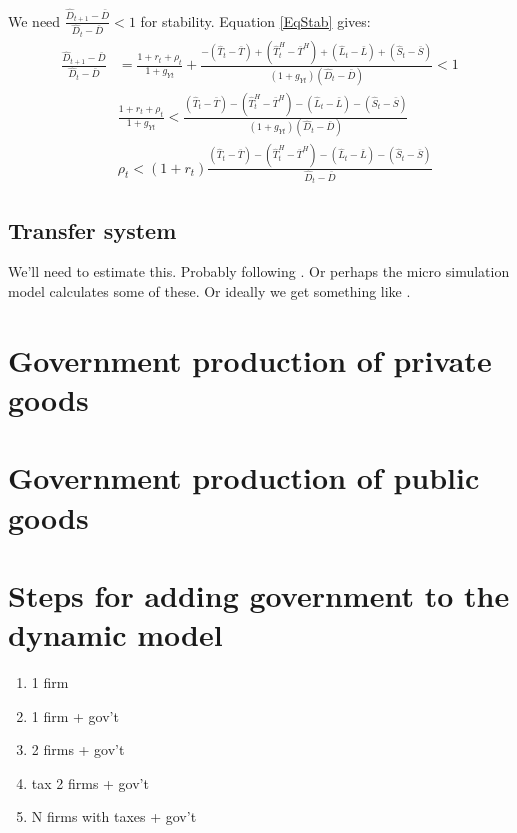       We need $\frac{\hat D_{t+1} - \bar D}{\hat D_{t} - \bar D} < 1$ for stability.  Equation \eqref{EqStab} gives:
      \begin{align} 
        \frac{\hat D_{t+1} - \bar D}{\hat D_t -\bar D} & = \frac{1+r_t+\rho_t}{1+g_{Yt}}  + \frac{-(\hat T_t - \bar T) + (\hat T^H_t -\bar T^H) + (\hat L_t -\bar L) + (\hat S_t -\bar S)}{(1+g_{Yt})(\hat D_t -\bar D)} < 1 \nonumber \\
        & \frac{1+r_t+\rho_t}{1+g_{Yt}}  < \frac{(\hat T_t - \bar T) - (\hat T^H_t -\bar T^H) - (\hat L_t -\bar L) - (\hat S_t -\bar S)}{(1+g_{Yt})(\hat D_t -\bar D)} \nonumber \\
        & \rho_t  < (1+r_t)\frac{(\hat T_t - \bar T) - (\hat T^H_t -\bar T^H) - (\hat L_t -\bar L) - (\hat S_t -\bar S)}{\hat D_t -\bar D}
      \end{align} 

    \subsection{Transfer system}
      We'll need to estimate this.  Probably following \citet{FR1993}.  Or perhaps the micro simulation model calculates some of these.  Or ideally we get something like \citet{KotlikoffXXXX}.

\section{Government production of private goods}

\section{Government production of public goods}

\section{Steps for adding government to the dynamic model}

\begin{enumerate}
\item 1 firm
\item 1 firm + gov't
\item 2 firms + gov't
\item tax 2 firms + gov't
\item N firms with taxes + gov't
\end{enumerate}
